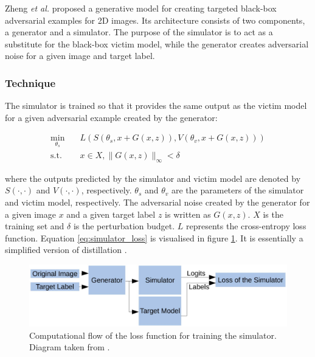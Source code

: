 Zheng \textit{et al.} \cite{zheng_black_box_GAN} proposed a generative model for creating targeted black-box adversarial examples for 2D images. Its architecture consists of two components, a generator and a simulator. The purpose of the simulator is to act as a substitute for the black-box victim model, while the generator creates adversarial noise for a given image and target label.

\subsubsection{Technique}

The simulator is trained so that it provides the same output as the victim model for a given adversarial example created by the generator:

\begin{equation}
\begin{aligned}
\min_{\theta_s} \quad & L(S(\theta_s, x + G(x, z)),V(\theta_v, x + G(x, z)))\\
\textrm{s.t.} \quad & x \in X, \|G(x, z)\|_\infty < \delta
\label{eq:simulator_loss}
\end{aligned}
\end{equation}

\noindent where the outputs predicted by the simulator and victim model are denoted by $S(\cdot,\cdot)$ and $V(\cdot,\cdot)$, respectively. $\theta_s$ and $\theta_v$ are the parameters of the simulator and victim model, respectively. The adversarial noise created by the generator for a given image $x$ and a given target label $z$ is written as $G(x,z)$. $X$ is the training set and $\delta$ is the perturbation budget. $L$ represents the cross-entropy loss function. Equation \ref{eq:simulator_loss} is visualised in figure \ref{fig:zheng_simulator_loss}. It is essentially a simplified version of distillation \cite{distillation}.

\begin{figure}[h]
    \centering
    \includegraphics[width=1\textwidth]{graphics/simulator_loss.JPG}
    \caption{Computational flow of the loss function for training the simulator. Diagram taken from \cite{zheng_black_box_GAN}.}
    \label{fig:zheng_simulator_loss}
\end{figure}

